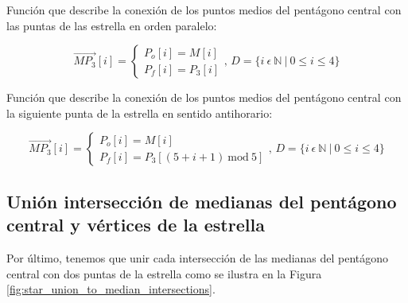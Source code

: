 \documentclass[oneside, a4paper]{article}
\begin{document}
            Función que describe la conexión de los puntos medios del pentágono central con las puntas de las estrella en orden paralelo:

            \begin{equation}
                \overrightarrow{MP_{3}}[i] =
                \begin{cases}
                    P_{o}[i] = M[i] \\
                    P_{f}[i] = P_{3}[i]
                \end{cases}
                \textrm{, } D = \{ i \: \epsilon \: \mathbb{N} \: | \: 0 \leqslant i \leqslant 4 \}
                \label{eq:union1_medians_vertices_pentagon_star}
            \end{equation}

            Función que describe la conexión de los puntos medios del pentágono central con la siguiente punta de la estrella en sentido antihorario:

            \begin{equation}
                \overrightarrow{MP_{3}}[i] =
                \begin{cases}
                    P_{o}[i] = M[i] \\
                    P_{f}[i] = P_{3}[(5 + i + 1) \: \textrm{mod} \: 5]
                \end{cases}
                \textrm{, } D = \{ i \: \epsilon \: \mathbb{N} \: | \: 0 \leqslant i \leqslant 4 \}
                \label{eq:union2_medians_vertices_pentagon_star}
            \end{equation}

        \subsection{Unión intersección de medianas del pentágono central y vértices de la estrella}
            Por último, tenemos que unir cada intersección de las medianas del pentágono central con dos puntas de la estrella como se ilustra en la Figura \ref{fig:star_union_to_median_intersections}.
            
\end{document}
